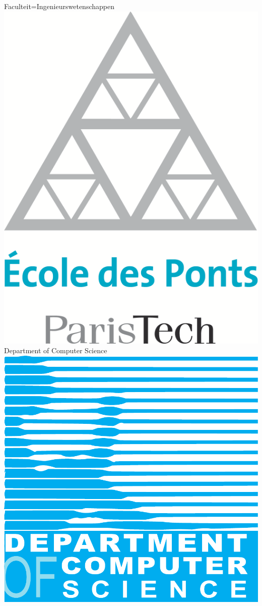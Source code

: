 \documentclass[landscape,a1paper,fontscale=0.45]{kuleuvenposter}
\begin{document}
\begin{poster}{Faculteit=Ingenieurswetenschappen}
{  \includegraphics[height=.8\footerheight]{images/logo_EcolePonts} %
}
{ %
  Department of Computer Science%
}
{ %
  \includegraphics[height=\footerheight]{images/logo_CS}%
}


\end{poster}
\end{document}

